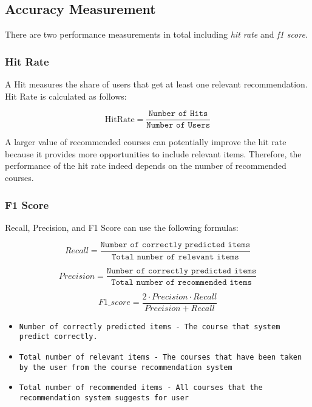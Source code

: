 \subsection{Accuracy Measurement}
There are two performance measurements in total including \textit{hit rate} and \textit{f1 score}.

\subsubsection{Hit Rate}

A Hit measures the share of users that get at least one relevant recommendation. Hit Rate is calculated as follows:

\begin{equation}
    \text{HitRate} = \frac{\texttt{Number of Hits}}{\texttt{Number of Users}}
\end{equation}

\noindent A larger value of recommended courses can potentially improve the hit rate because it provides more opportunities to include relevant items. Therefore, the performance of the hit rate indeed depends on the number of recommended courses.


\subsubsection{F1 Score}

Recall, Precision, and F1 Score can use the following formulas:

\begin{equation}
    Recall = \frac{\texttt{Number of correctly predicted items}}{\texttt{Total number of relevant items}}
\end{equation}

\begin{equation}
    Precision = \frac{\texttt{Number of correctly predicted items}}{\texttt{Total number of recommended items}}
\end{equation}

\begin{equation}
    F1\_score = \frac{2⋅Precision⋅Recall}{Precision+Recall}
\end{equation}

\begin{itemize}
    \item \texttt{Number of correctly predicted items - The course that system predict correctly.}
    \item \texttt{Total number of relevant items - The courses that have been taken by the user from the course recommendation system}
    \item \texttt{Total number of recommended items - All courses that the recommendation system suggests for user}
\end{itemize}

